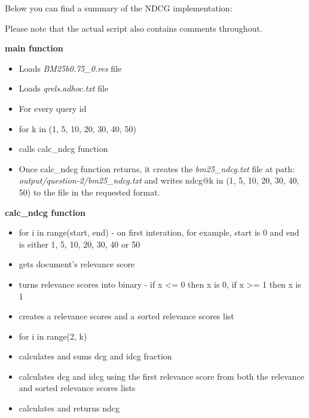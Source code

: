 \documentclass{article} %
\begin{document}
Below you can find a summary of the NDCG implementation:

Please note that the actual script also contains comments throughout.

\textbf{main function}

\begin{itemize}
    \item Loads \textit{BM25b0.75\_0.res} file
    \item Loads \textit{qrels.adhoc.txt} file
    \item For every query id
    \item for k in (1, 5, 10, 20, 30, 40, 50)
    \item calls calc\_ndcg function
    \item Once calc\_ndcg function returns, it creates the \textit{bm25\_ndcg.txt} file at path: \textit{output/question-2/bm25\_ndcg.txt} and writes ndcg@k in (1, 5, 10, 20, 30, 40, 50) to the file in the requested format.
\end{itemize}

\textbf{calc\_ndcg function}

\begin{itemize}
    \item for i in range(start, end) - on first interation, for example, start is 0 and end is either 1, 5, 10, 20, 30, 40 or 50
    \item gets document's relevance score
    \item turns relevance scores into binary - if x \textless= 0 then x is 0, if x \textgreater= 1 then x is 1
    \item creates a relevance scores and a sorted relevance scores list
    \item for i in range(2, k)
    \item calculates and sums dcg and idcg fraction
    \item calculates dcg and idcg using the first relevance score from both the relevance and sorted relevance scores lists
    \item calculates and returns ndcg
\end{itemize}
\end{document}
